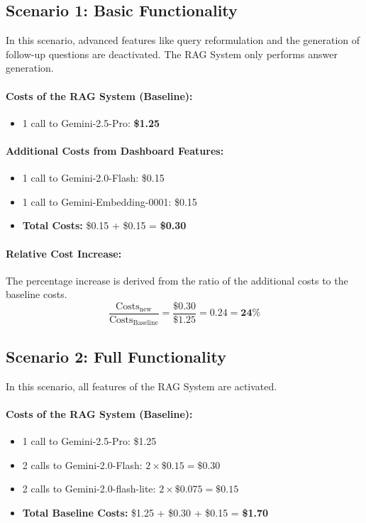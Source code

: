 \documentclass[
	english,
	ruledheaders=section,%
	class=report,%
	thesis={type=bachelor},%
	accentcolor=1b,%
	custommargins=true,%
	marginpar=false,%
	parskip=half-,%
	fontsize=11pt,%
	DIV=14,
]{tudapub}
\begin{document}
\subsection*{Scenario 1: Basic Functionality}
In this scenario, advanced features like query reformulation and the generation of follow-up questions are deactivated. The RAG System only performs answer generation.

\paragraph{Costs of the RAG System (Baseline):}
\begin{itemize}
    \item 1 call to Gemini-2.5-Pro: \textbf{\$1.25}
\end{itemize}

\paragraph{Additional Costs from Dashboard Features:}
\begin{itemize}
    \item 1 call to Gemini-2.0-Flash: \$0.15
    \item 1 call to Gemini-Embedding-0001: \$0.15
    \item \textbf{Total Costs:} \$0.15 + \$0.15 = \textbf{\$0.30}
\end{itemize}

\paragraph{Relative Cost Increase:}
The percentage increase is derived from the ratio of the additional costs to the baseline costs.
\begin{equation*}
\frac{\text{Costs}_\text{new}}{\text{Costs}_\text{Baseline}} = \frac{\$0.30}{\$1.25} = 0.24 = \textbf{24\%}
\end{equation*}

\subsection*{Scenario 2: Full Functionality}
In this scenario, all features of the RAG System are activated.

\paragraph{Costs of the RAG System (Baseline):}
\begin{itemize}
    \item 1 call to Gemini-2.5-Pro: \$1.25
    \item 2 calls to Gemini-2.0-Flash: $2 \times \$0.15 = \$0.30$
    \item 2 calls to Gemini-2.0-flash-lite: $2 \times \$0.075 = \$0.15$
    \item \textbf{Total Baseline Costs:} \$1.25 + \$0.30 + \$0.15 = \textbf{\$1.70}
\end{itemize}
\end{document}
